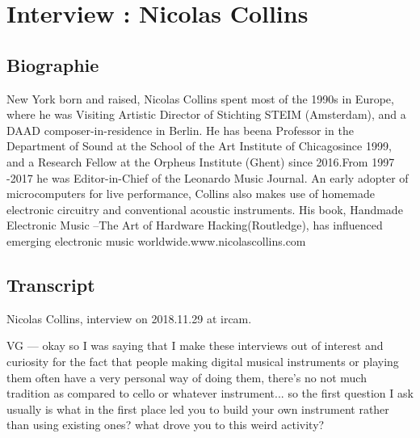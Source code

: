 \chapter{Interview : Nicolas Collins}

\section*{Biographie}
New York born and raised, Nicolas Collins spent most of the 1990s in Europe, where he was Visiting Artistic Director of Stichting STEIM (Amsterdam), and a DAAD composer-in-residence in Berlin. He has beena Professor in the Department of Sound at the School of the Art Institute of Chicagosince 1999, and a Research Fellow at the Orpheus Institute (Ghent) since 2016.From 1997 -2017 he was Editor-in-Chief of the Leonardo Music Journal. An early adopter of microcomputers for live performance, Collins also makes use of homemade electronic circuitry and conventional acoustic instruments.  His book, Handmade Electronic Music –The Art of Hardware Hacking(Routledge), has influenced emerging electronic music worldwide.www.nicolascollins.com

\section*{Transcript}

Nicolas Collins, interview on 2018.11.29 at ircam.

VG — okay so I was saying that I make these interviews out of interest and curiosity for the fact that people making digital musical instruments or  playing them often have a very personal way of doing them, there's no not much tradition as compared to cello or whatever instrument... so the first question I ask usually is what in the first place led you to build your own instrument rather than using existing ones? what drove you to this weird activity?

